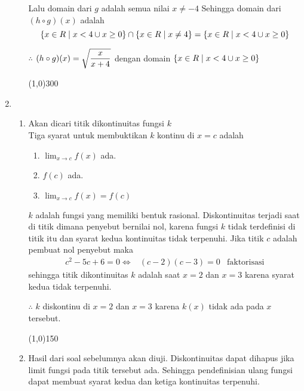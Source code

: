 \begin{enumerate}[leftmargin=*, label={\arabic*}.]
\begin{enumerate}[label={\alph*}.]
Lalu domain dari $g$ adalah semua nilai $x \neq -4$
Sehingga domain dari $(h \circ g)(x)$ adalah
\[
\set*{x \in R \mid x < 4 \cup x \geq 0} \cap \set*{x \in R \mid x \neq 4} 
= \set*{x \in R \mid x < 4 \cup x \geq 0}
\]

$\therefore$ $\ds (h \circ g)(x) = \sqrt{\frac{x}{x+4}}$ dengan domain 
$\set*{x \in R \mid x < 4 \cup x \geq 0}$ 
\begin{center}
    \line(1,0){300}
\end{center}
\end{enumerate}
\item
\begin{enumerate}[label={\alph*}.]
\item Akan dicari titik dikontinuitas fungsi $k$\\
Tiga syarat untuk membuktikan $k$ kontinu di $x=c$ adalah
\begin{enumerate}[label={\arabic*}.]
    \item $\lim_{x\to c} f(x)$ ada.
    \item $f(c)$ ada.
    \item $\lim_{x\to c} f(x) = f(c)$
\end{enumerate}
$k$ adalah fungsi yang memiliki bentuk rasional. Diskontinuitas terjadi saat 
di titik dimana penyebut bernilai nol, karena fungsi $k$ tidak terdefinisi 
di titik itu dan syarat kedua kontinuitas tidak terpenuhi.
Jika titik $c$ adalah pembuat nol penyebut maka
\begin{align*}
    c^{2} - 5c + 6 = 0
    \iff &(c-2)(c-3) = 0
    &\text{faktorisasi}
\end{align*}
sehingga titik dikontinuitas $k$ adalah saat $x=2$ dan $x=3$ karena syarat kedua 
tidak terpenuhi.

$\therefore$ $k$ diskontinu di $x=2$ dan $x=3$ karena $k(x)$ tidak ada pada 
$x$ tersebut.
\begin{center}
    \line(1,0){150}
\end{center}
\item Hasil dari soal sebelumnya akan diuji. Diskontinuitas dapat dihapus jika limit 
fungsi pada titik tersebut ada. Sehingga pendefinisian ulang fungsi dapat membuat 
syarat kedua dan ketiga kontinuitas terpenuhi.


\end{enumerate}
\end{enumerate}
